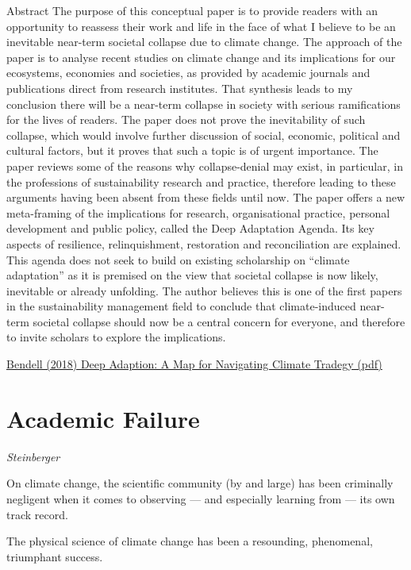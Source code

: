 \documentclass[
]{book}
\begin{document}
Abstract
The purpose of this conceptual paper is to provide readers with an opportunity to reassess
their work and life in the face of what I believe to be an inevitable near-term societal collapse
due to climate change.
The approach of the paper is to analyse recent studies on climate change and its implications
for our ecosystems, economies and societies, as provided by academic journals and
publications direct from research institutes.
That synthesis leads to my conclusion there will be a near-term collapse in society with serious
ramifications for the lives of readers. The paper does not prove the inevitability of such
collapse, which would involve further discussion of social, economic, political and cultural
factors, but it proves that such a topic is of urgent importance. The paper reviews some of the
reasons why collapse-denial may exist, in particular, in the professions of sustainability
research and practice, therefore leading to these arguments having been absent from these
fields until now.
The paper offers a new meta-framing of the implications for research, organisational practice,
personal development and public policy, called the Deep Adaptation Agenda. Its key aspects
of resilience, relinquishment, restoration and reconciliation are explained. This agenda does
not seek to build on existing scholarship on ``climate adaptation'' as it is premised on the view
that societal collapse is now likely, inevitable or already unfolding.
The author believes this is one of the first papers in the sustainability management field to
conclude that climate-induced near-term societal collapse should now be a central concern for
everyone, and therefore to invite scholars to explore the implications.

\href{pdf/Bendell_2020_Deep_Adaptation.pdf}{Bendell (2018) Deep Adaption: A Map for Navigating Climate Tradegy (pdf)}

\hypertarget{academic-failure}{%
\chapter{Academic Failure}\label{academic-failure}}

\emph{Steinberger}

On climate change, the scientific community (by and large) has been criminally negligent when it comes to observing --- and especially learning from --- its own track record.

The physical science of climate change has been a resounding, phenomenal, triumphant success.
\end{document}

